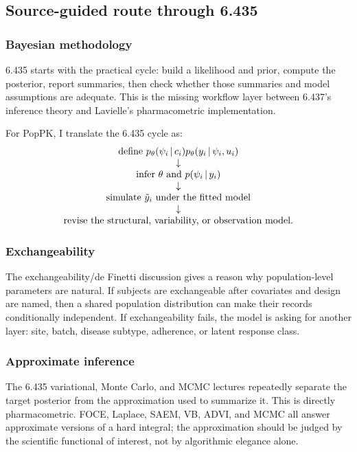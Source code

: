 \subsection{Source-guided route through 6.435}

\subsubsection*{Bayesian methodology}

6.435 starts with the practical cycle: build a likelihood and prior, compute the posterior, report summaries, then check whether those summaries and model assumptions are adequate.  This is the missing workflow layer between 6.437's inference theory and Lavielle's pharmacometric implementation.

For PopPK, I translate the 6.435 cycle as:
\[
  \begin{array}{c}
    \text{define }p_\theta(\psi_i\,|\, c_i)p_\theta(y_i\,|\,\psi_i,u_i)\\
    \downarrow\\
    \text{infer }\theta\text{ and }p(\psi_i\,|\, y_i)\\
    \downarrow\\
    \text{simulate }\tilde y_i\text{ under the fitted model}\\
    \downarrow\\
    \text{revise the structural, variability, or observation model.}
  \end{array}
\]

\subsubsection*{Exchangeability}

The exchangeability/de Finetti discussion gives a reason why population-level parameters are natural.  If subjects are exchangeable after covariates and design are named, then a shared population distribution can make their records conditionally independent.  If exchangeability fails, the model is asking for another layer: site, batch, disease subtype, adherence, or latent response class.

\subsubsection*{Approximate inference}

The 6.435 variational, Monte Carlo, and MCMC lectures repeatedly separate the target posterior from the approximation used to summarize it.  This is directly pharmacometric.  FOCE, Laplace, SAEM, VB, ADVI, and MCMC all answer approximate versions of a hard integral; the approximation should be judged by the scientific functional of interest, not by algorithmic elegance alone.

